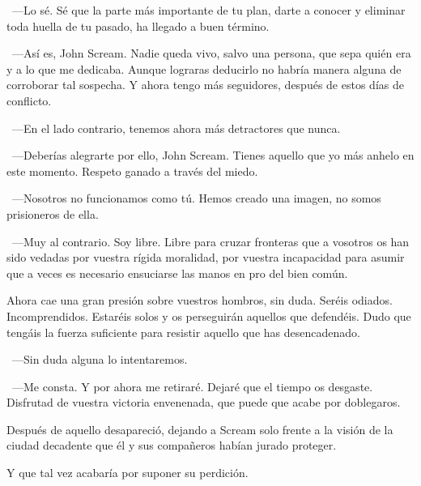 ~---Lo sé. Sé que la parte más importante de tu plan, darte a conocer y eliminar toda huella de tu pasado, ha llegado a buen término.

~---Así es, John Scream. Nadie queda vivo, salvo una persona, que sepa quién era y a lo que me dedicaba. Aunque lograras deducirlo no habría manera alguna de corroborar tal sospecha. Y ahora tengo más seguidores, después de estos días de conflicto.

~---En el lado contrario, tenemos ahora más detractores que nunca.

~---Deberías alegrarte por ello, John Scream. Tienes aquello que yo más anhelo en este momento. Respeto ganado a través del miedo.

~---Nosotros no funcionamos como tú. Hemos creado una imagen, no somos prisioneros de ella.

~---Muy al contrario. Soy libre. Libre para cruzar fronteras que a vosotros os han sido vedadas por vuestra rígida moralidad, por vuestra incapacidad para asumir que a veces es necesario ensuciarse las manos en pro del bien común.

\rquoti Ahora cae una gran presión sobre vuestros hombros, sin duda. Seréis odiados. Incomprendidos. Estaréis solos y os perseguirán aquellos que defendéis. Dudo que tengáis la fuerza suficiente para resistir aquello que has desencadenado.

~---Sin duda alguna lo intentaremos.

~---Me consta. Y por ahora me retiraré. Dejaré que el tiempo os desgaste. Disfrutad de vuestra victoria envenenada, que puede que acabe por doblegaros.

Después de aquello desapareció, dejando a Scream solo frente a la visión de la ciudad decadente que él y sus compañeros habían jurado proteger.

Y que tal vez acabaría por suponer su perdición.
